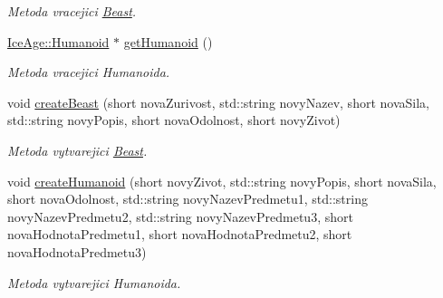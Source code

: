 \begin{DoxyCompactItemize}
\begin{DoxyCompactList}\small\item\em Metoda vracejici \hyperlink{classIceAge_1_1Beast}{Beast}. \end{DoxyCompactList}\item 
\hyperlink{classIceAge_1_1Humanoid}{Ice\+Age\+::\+Humanoid} $\ast$ \hyperlink{classIceAge_1_1BuilderBytost_a41d069e42ccad24d1af34e3e30945e25}{get\+Humanoid} ()
\begin{DoxyCompactList}\small\item\em Metoda vracejici Humanoida. \end{DoxyCompactList}\item 
void \hyperlink{classIceAge_1_1BuilderBytost_a090e775261513f873b1aa85dcaca5efb}{create\+Beast} (short nova\+Zurivost, std\+::string novy\+Nazev, short nova\+Sila, std\+::string novy\+Popis, short nova\+Odolnost, short novy\+Zivot)
\begin{DoxyCompactList}\small\item\em Metoda vytvarejici \hyperlink{classIceAge_1_1Beast}{Beast}. \end{DoxyCompactList}\item 
void \hyperlink{classIceAge_1_1BuilderBytost_ad0ec5281ef8ba796b945845913802b32}{create\+Humanoid} (short novy\+Zivot, std\+::string novy\+Popis, short nova\+Sila, short nova\+Odolnost, std\+::string novy\+Nazev\+Predmetu1, std\+::string novy\+Nazev\+Predmetu2, std\+::string novy\+Nazev\+Predmetu3, short nova\+Hodnota\+Predmetu1, short nova\+Hodnota\+Predmetu2, short nova\+Hodnota\+Predmetu3)
\begin{DoxyCompactList}\small\item\em Metoda vytvarejici Humanoida. \end{DoxyCompactList}\end{DoxyCompactItemize}
